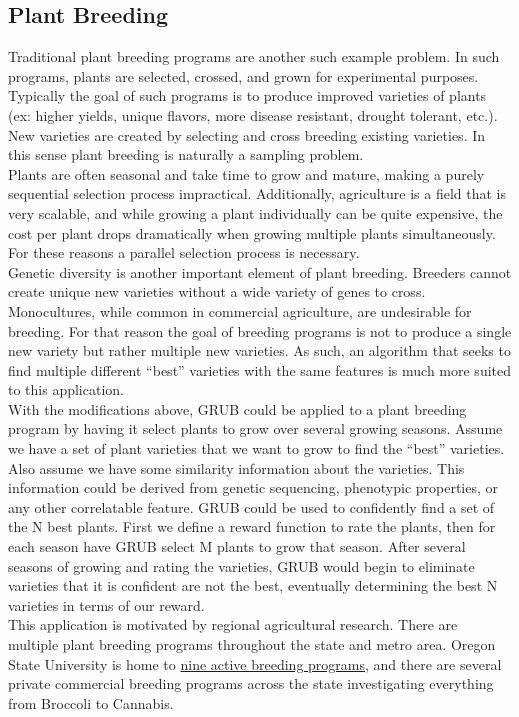 \documentclass{article}[12pt]
\begin{document}
\subsection{Plant Breeding}

Traditional plant breeding programs are another such example problem.
In such programs, plants are selected, crossed, and grown for experimental purposes.
Typically the goal of such programs is to produce improved varieties of plants (ex: higher yields, unique flavors, more disease resistant, drought tolerant, etc.).
New varieties are created by selecting and cross breeding existing varieties. In this sense plant breeding is naturally a sampling problem. \\

Plants are often seasonal and take time to grow and mature, making a purely sequential selection process impractical.
Additionally, agriculture is a field that is very scalable, and while growing a plant individually can be quite expensive,
the cost per plant drops dramatically when growing multiple plants simultaneously.
For these reasons a parallel selection process is necessary. \\

Genetic diversity is another important element of plant breeding.
Breeders cannot create unique new varieties without a wide variety of genes to cross.
Monocultures, while common in commercial agriculture, are undesirable for breeding.
For that reason the goal of breeding programs is not to produce a single new variety but rather multiple new varieties.
As such, an algorithm that seeks to find multiple different ``best'' varieties with the same features is much more suited to this application. \\

With the modifications above, GRUB could be applied to a plant breeding program by having it select plants to grow over several growing seasons.
Assume we have a set of plant varieties that we want to grow to find the ``best'' varieties.
Also assume we have some similarity information about the varieties.
This information could be derived from genetic sequencing, phenotypic properties, or any other correlatable feature.
GRUB could be used to confidently find a set of the N best plants.
First we define a reward function to rate the plants, then for each season have GRUB select M plants to grow that season.
After several seasons of growing and rating the varieties, GRUB would begin to eliminate varieties that it is confident are not the best,
eventually determining the best N varieties in terms of our reward. \\

This application is motivated by regional agricultural research.
There are multiple plant breeding programs throughout the state and metro area.
Oregon State University is home to \href{https://plantbreeding.oregonstate.edu/}{nine active breeding programs},
and there are several private commercial breeding programs across the state investigating everything from Broccoli to Cannabis.
\end{document}
